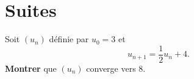 \documentclass[12pt]{neoschool}
\begin{document}
\section{Suites}
Soit $(u_n)$ définie par $u_0 = 3$ et
\begin{equation}
  u_{n+1} = \frac{1}{2} u_n + 4 .
\end{equation}
\textbf{Montrer} que $(u_n)$ converge vers $8$.
\end{document}
